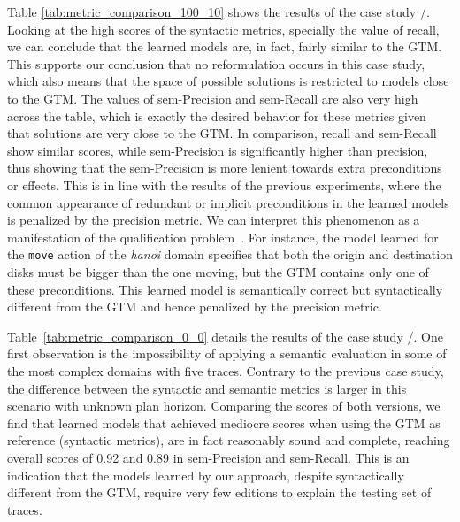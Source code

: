 Table \ref{tab:metric_comparison_100_10} shows the results of the case study \FO/\PO. Looking at the high scores of the syntactic metrics, specially the value of recall, we can conclude that the learned models are, in fact, fairly similar to the GTM. This supports our conclusion that no reformulation occurs in this case study, which also means that the space of possible solutions is restricted to models close to the GTM. The values of sem-Precision and sem-Recall are also very high across the table, which is exactly the desired behavior for these metrics given that solutions are very close to the GTM. In comparison, recall and sem-Recall show similar scores, while sem-Precision is significantly higher than precision, thus showing that the sem-Precision is more lenient towards extra preconditions or effects. This is in line with the results of the previous experiments, where the common appearance of redundant or implicit preconditions in the learned models is penalized by the precision metric. We can interpret this phenomenon as a manifestation of the qualification problem~\cite{GinsbergS88}. For instance, the model learned for the {\tt\small move} action of the {\em hanoi} domain specifies that both the origin and destination disks must be bigger than the one moving, but the GTM contains only one of these preconditions. This learned model is semantically correct but syntactically different from the GTM and hence penalized by the precision metric.

Table~\ref{tab:metric_comparison_0_0} details the results of the case study \NO/\NO. One first observation is the impossibility of applying a semantic evaluation in some of the most complex domains with five traces. Contrary to the previous case study, the difference between the syntactic and semantic metrics is larger in this scenario with unknown plan horizon. Comparing the scores of both versions, we find that learned models that achieved mediocre scores when using the GTM as reference (syntactic metrics), are in fact reasonably sound and complete, reaching overall scores of 0.92 and 0.89 in sem-Precision and sem-Recall. This is an indication that the models learned by our approach, despite syntactically different from the GTM, require very few editions to explain the testing set of traces.

